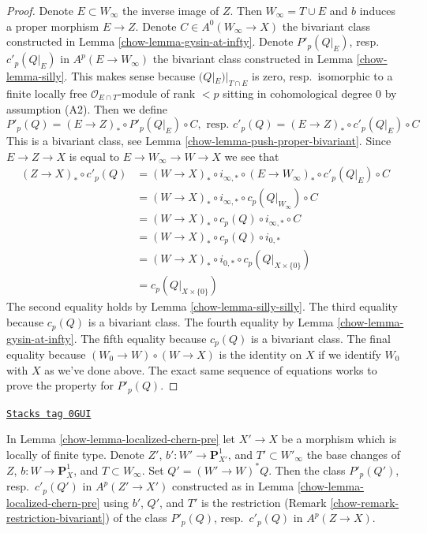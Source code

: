\begin{proof}

Denote $E \subset W_\infty$ the inverse image of $Z$. Then
$W_\infty = T \cup E$ and $b$ induces a proper morphism $E \to Z$.
Denote $C \in A^0(W_\infty \to X)$ the bivariant class constructed
in Lemma \ref{chow-lemma-gysin-at-infty}. Denote $P'_p(Q|_E)$, resp.\ $c'_p(Q|_E)$
in $A^p(E \to W_\infty)$ the bivariant class constructed
in Lemma \ref{chow-lemma-silly}. This makes sense because
$(Q|_E)|_{T \cap E}$ is zero, resp.\ isomorphic to a finite locally free
$\mathcal{O}_{E \cap T}$-module of rank $< p$ sitting in
cohomological degree $0$ by assumption (A2). Then we define
$$
P'_p(Q) = (E \to Z)_* \circ P'_p(Q|_E) \circ C,\text{ resp. }
c'_p(Q) = (E \to Z)_* \circ c'_p(Q|_E) \circ C
$$
This is a bivariant class, see Lemma \ref{chow-lemma-push-proper-bivariant}.
Since $E \to Z \to X$ is equal to $E \to W_\infty \to W \to X$ we see that
\begin{align*}
(Z \to X)_* \circ c'_p(Q)
& =
(W \to X)_* \circ i_{\infty, *} \circ (E \to W_\infty)_*
\circ c'_p(Q|_E) \circ C \\
& =
(W \to X)_* \circ i_{\infty, *} \circ c_p(Q|_{W_\infty}) \circ C \\
& =
(W \to X)_* \circ c_p(Q) \circ i_{\infty, *} \circ C \\
& =
(W \to X)_*\circ c_p(Q) \circ i_{0, *} \\
& =
(W \to X)_* \circ i_{0, *} \circ c_p(Q|_{X \times \{0\}}) \\
& =
c_p(Q|_{X \times \{0\}})
\end{align*}
The second equality holds by Lemma \ref{chow-lemma-silly-silly}.
The third equality because $c_p(Q)$ is a bivariant class.
The fourth equality by Lemma \ref{chow-lemma-gysin-at-infty}.
The fifth equality because $c_p(Q)$ is a bivariant class.
The final equality because $(W_0 \to W) \circ (W \to X)$
is the identity on $X$ if we identify $W_0$ with $X$ as we've
done above. The exact same sequence of equations works to
prove the property for $P'_p(Q)$.
\end{proof}

\begin{lemma}
\label{chow-lemma-base-change-localized-chern-pre}
\href{https://stacks.math.columbia.edu/tag/0GUI}{\texttt{Stacks tag 0GUI}}

In Lemma \ref{chow-lemma-localized-chern-pre} let $X' \to X$ be a morphism
which is locally of finite type. Denote
$Z'$, $b' : W' \to \mathbf{P}^1_{X'}$, and $T' \subset W'_\infty$
the base changes of $Z$, $b : W \to \mathbf{P}^1_X$, and $T \subset W_\infty$.
Set $Q' = (W' \to W)^*Q$. Then the class
$P'_p(Q')$, resp.\ $c'_p(Q')$ in $A^p(Z' \to X')$ constructed as in
Lemma \ref{chow-lemma-localized-chern-pre} using $b'$, $Q'$, and $T'$
is the restriction (Remark \ref{chow-remark-restriction-bivariant})
of the class $P'_p(Q)$, resp.\ $c'_p(Q)$ in $A^p(Z \to X)$.
\end{lemma}

